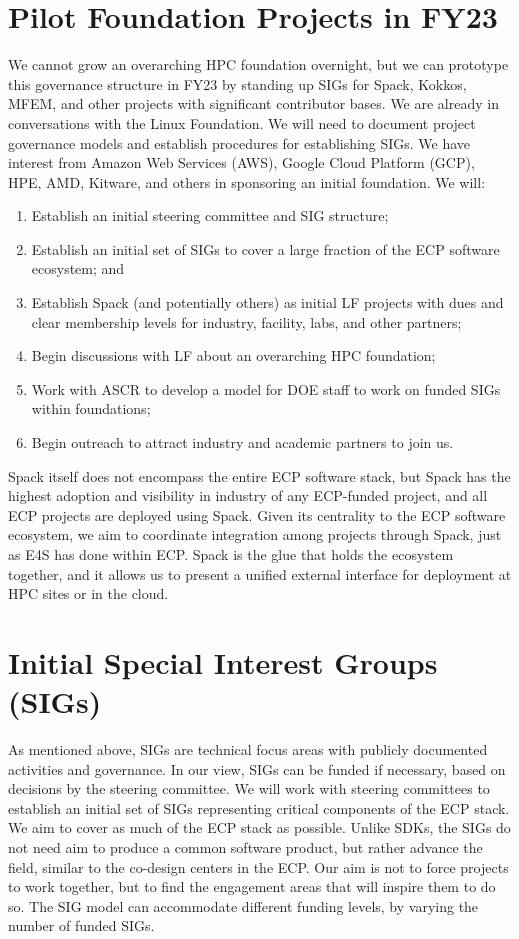 \documentclass[11pt]{article}
\begin{document}
\section{Pilot Foundation Projects in FY23}

We cannot grow an overarching HPC foundation overnight, but we can prototype this
governance structure in FY23 by standing up SIGs for Spack, Kokkos, MFEM, and other
projects with significant contributor bases. We are already in conversations with the
Linux Foundation. We will need to document project governance models and establish
procedures for establishing SIGs. We have interest from Amazon Web Services (AWS),
Google Cloud Platform (GCP), HPE, AMD, Kitware, and others in sponsoring an initial
foundation. We will:

\begin{enumerate}
\item Establish an initial steering committee and SIG structure;
\item Establish an initial set of SIGs to cover a large fraction of the ECP software
  ecosystem; and
\item Establish Spack (and potentially others) as initial LF projects with dues and
  clear membership levels for industry, facility, labs, and other partners;
\item Begin discussions with LF about an overarching HPC foundation;
\item Work with ASCR to develop a model for DOE staff to work on funded SIGs within
  foundations;
\item Begin outreach to attract industry and academic partners to join us.
\end{enumerate}

Spack itself does not encompass the entire ECP software stack, but Spack has the highest
adoption and visibility in industry of any ECP-funded project, and all ECP projects are
deployed using Spack. Given its centrality to the ECP software ecosystem, we aim to
coordinate integration among projects through Spack, just as E4S has done within ECP.
Spack is the glue that holds the ecosystem together, and it allows us to present a
unified external interface for deployment at HPC sites or in the cloud.

\section{Initial Special Interest Groups (SIGs)}

As mentioned above, SIGs are technical focus areas with publicly documented activities
and governance. In our view, SIGs can be funded if necessary, based on decisions by the
steering committee. We will work with steering committees to establish an initial set of
SIGs representing critical components of the ECP stack. We aim to cover as much of the
ECP stack as possible. Unlike SDKs, the SIGs do not need aim to produce a common
software product, but rather advance the field, similar to the co-design centers in the
ECP. Our aim is not to force projects to work together, but to find the engagement areas
that will inspire them to do so. The SIG model can accommodate different funding levels,
by varying the number of funded SIGs.
\end{document}
